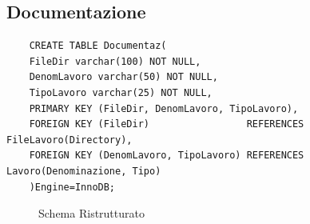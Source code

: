 \documentclass{elegantbook}
\begin{document}
\subsection{Documentazione}
\begin{verbatim}
	CREATE TABLE Documentaz(
	FileDir varchar(100) NOT NULL,
	DenomLavoro varchar(50) NOT NULL,
	TipoLavoro varchar(25) NOT NULL,
	PRIMARY KEY (FileDir, DenomLavoro, TipoLavoro),
	FOREIGN KEY (FileDir)    			  REFERENCES FileLavoro(Directory),
	FOREIGN KEY (DenomLavoro, TipoLavoro) REFERENCES Lavoro(Denominazione, Tipo)
	)Engine=InnoDB;
\end{verbatim}
\begin{figure}[H]
	\centering
	\caption{Schema Ristrutturato}
\end{figure}
\end{document}
